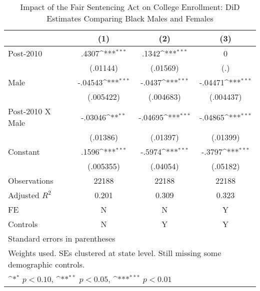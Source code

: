 \begin{table}[htbp]\centering
\def\sym#1{\ifmmode^{#1}\else\(^{#1}\)\fi}
\caption{Impact of the Fair Sentencing Act on College Enrollment: DiD Estimates Comparing Black Males and Females}
\begin{tabular}{l*{3}{c}}
\hline\hline
                    &\multicolumn{1}{c}{(1)}         &\multicolumn{1}{c}{(2)}         &\multicolumn{1}{c}{(3)}         \\
\hline
Post-2010           &       .4307\sym{***}&       .1342\sym{***}&           0         \\
                    &    (.01144)         &    (.01569)         &         (.)         \\
[1em]
Male                &     -.04543\sym{***}&      -.0437\sym{***}&     -.04471\sym{***}\\
                    &   (.005422)         &   (.004683)         &   (.004437)         \\
[1em]
Post-2010 X Male    &     -.03046\sym{**} &     -.04695\sym{***}&     -.04865\sym{***}\\
                    &    (.01386)         &    (.01397)         &    (.01399)         \\
[1em]
Constant            &       .1596\sym{***}&      -.5974\sym{***}&      -.3797\sym{***}\\
                    &   (.005355)         &    (.04054)         &    (.05182)         \\
\hline
Observations        &       22188         &       22188         &       22188         \\
Adjusted \(R^{2}\)  &       0.201         &       0.309         &       0.323         \\
FE                  &           N         &           N         &           Y         \\
Controls            &           N         &           Y         &           Y         \\
\hline\hline
\multicolumn{4}{l}{\footnotesize Standard errors in parentheses}\\
\multicolumn{4}{l}{\footnotesize Weights used. SEs clustered at state level. Still missing some demographic controls.}\\
\multicolumn{4}{l}{\footnotesize \sym{*} \(p<0.10\), \sym{**} \(p<0.05\), \sym{***} \(p<0.01\)}\\
\end{tabular}
\end{table}
